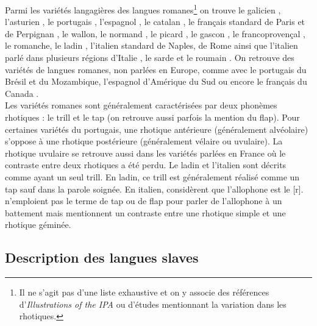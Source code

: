 Parmi les variétés langagières des langues romanes\footnote{Il ne s'agit pas d'une liste exhaustive et on y associe des références d'\textit{Illustrations of the IPA} ou d'études mentionnant la variation dans les rhotiques.} on trouve le galicien \parencite{regueiraGalician1996}, l'asturien \parencite{muniz-cachonAsturian2018}, le portugais \parencite{cruz-ferreiraEuropeanPortuguese1995}, l'espagnol \parencite{haroEasternAndalusianSpanish2020}, le catalan \parencite{carbonellCatalan1992}, le français standard de Paris et de Perpignan \parencite{fougeronFrench1993}, le wallon, le normand \parencite{buscailFrenchOrneSpeaker2016}, le picard \parencite{prematRouleFrancaisDans2018}, le gascon \parencite{mooneyBearnaisGascon2014}, le francoprovençal \parencite{kasstanLyonnaisFrancoprovencal2015}, le romanche, le ladin \parencite{yangLadinVarietiesVal2021}, l'italien standard de Naples, de Rome ainsi que l'italien parlé dans plusieurs régions d'Italie \parencite{rogersItalian2004, bertinettoSoundPatternStandard2005}, le sarde \parencite{mereuCagliariSardinian2019} et le roumain \parencite{raduConditionedVariabilityRealization2016}. On retrouve des variétés de langues romanes, non parlées en Europe, comme avec le portugais du Brésil \parencite{barbosaBrazilianPortuguese2004} et du Mozambique, l'espagnol d'Amérique du Sud \parencite{avelinoMexicoCitySpanish2018,colomaArgentineSpanish2018} ou encore le français du Canada \parencite{sankoffLanguageChangeLifespan2007,sankoffInstabilityAlternationMontreal2013}.\\

Les variétés romanes sont généralement caractérisées par deux phonèmes rhotiques : le trill et le tap (on retrouve aussi parfois la mention du flap). Pour certaines variétés du portugais, une rhotique antérieure (généralement alvéolaire) s'oppose à une rhotique postérieure (généralement vélaire ou uvulaire). La rhotique uvulaire se retrouve aussi dans les variétés parlées en France où le contraste entre deux rhotiques a été perdu.
Le ladin et l'italien sont décrits comme ayant un seul trill. En ladin, ce trill est généralement réalisé comme un tap sauf dans la parole soignée. En italien, \textcite{rogersItalian2004} considèrent que l'allophone  est le [r]. \textcite{bertinettoSoundPatternStandard2005} n'emploient pas le terme de tap ou de flap pour parler de l'allophone à un battement mais mentionnent un contraste entre une rhotique simple et une rhotique géminée.

\subsection{Description des langues slaves}

